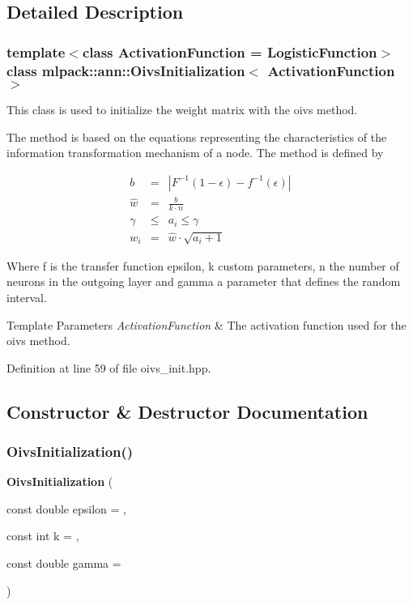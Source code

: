 \subsection{Detailed Description}
\subsubsection*{template$<$class Activation\+Function = Logistic\+Function$>$\newline
class mlpack\+::ann\+::\+Oivs\+Initialization$<$ Activation\+Function $>$}

This class is used to initialize the weight matrix with the oivs method. 

The method is based on the equations representing the characteristics of the information transformation mechanism of a node. The method is defined by

\begin{eqnarray*} b &=& |F^{-1}(1 - \epsilon) - f^{-1}(\epsilon)| \\ \hat{w} &=& \frac{b}{k \cdot n} \\ \gamma &\le& a_i \le \gamma \\ w_i &=& \hat{w} \cdot \sqrt{a_i + 1} \end{eqnarray*}

Where f is the transfer function epsilon, k custom parameters, n the number of neurons in the outgoing layer and gamma a parameter that defines the random interval.


\begin{DoxyTemplParams}{Template Parameters}
{\em Activation\+Function} & The activation function used for the oivs method. \\
\hline
\end{DoxyTemplParams}


Definition at line 59 of file oivs\+\_\+init.\+hpp.



\subsection{Constructor \& Destructor Documentation}
\mbox{\label{classmlpack_1_1ann_1_1OivsInitialization_a4a64a3e0ca005879d29245e45f027770}} 
\subsubsection{Oivs\+Initialization()}
{\footnotesize\ttfamily \textbf{ Oivs\+Initialization} (\begin{DoxyParamCaption}\item[{const double}]{epsilon = {},  }\item[{const int}]{k = {},  }\item[{const double}]{gamma = {} }\end{DoxyParamCaption})\hspace{0.3cm}{\ttfamily [inline]}}



